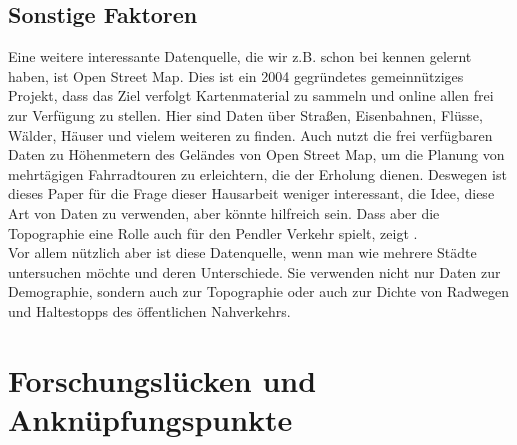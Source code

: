 \documentclass[a4paper,12pt]{thesis}
\begin{document}
\subsection{Sonstige Faktoren}

Eine weitere interessante Datenquelle, die wir z.B. schon bei \cite{Alattar2021} kennen gelernt haben, ist Open Street Map. Dies ist ein 2004 gegründetes gemeinnütziges Projekt, dass das Ziel verfolgt Kartenmaterial zu sammeln und online allen frei zur Verfügung zu stellen. Hier sind Daten über Straßen, Eisenbahnen, Flüsse, Wälder, Häuser und vielem weiteren zu finden. Auch \cite{Carl2015} nutzt die frei verfügbaren Daten zu Höhenmetern des Geländes von Open Street Map, um die Planung von mehrtägigen Fahrradtouren zu erleichtern, die der Erholung dienen. Deswegen ist dieses Paper für die Frage dieser Hausarbeit weniger interessant, die Idee, diese Art von Daten zu verwenden, aber könnte hilfreich sein. Dass aber die Topographie eine Rolle auch für den Pendler Verkehr spielt, zeigt \cite{Rietveld2004}.\\
Vor allem nützlich aber ist diese Datenquelle, wenn man wie \cite{Goldmann2021} mehrere Städte untersuchen möchte und deren Unterschiede. Sie verwenden nicht nur Daten zur Demographie, sondern auch zur Topographie oder auch zur Dichte von Radwegen und Haltestopps des öffentlichen Nahverkehrs.

\section{Forschungslücken und Anknüpfungspunkte}
\end{document}
